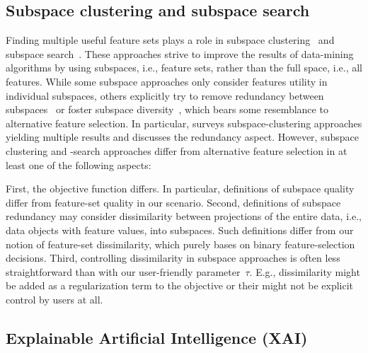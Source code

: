 \documentclass{article}
\theoremstyle{definition}
\begin{document}
\subsection{Subspace clustering and subspace search}
\label{sec:afs:related-work:subspace}

Finding multiple useful feature sets plays a role in subspace clustering~\cite{hu2018subspace, mueller2009relevant} and subspace search~\cite{fouche2021efficient, nguyen20134s, trittenbach2019dimension}.
These approaches strive to improve the results of data-mining algorithms by using subspaces, i.e., feature sets, rather than the full space, i.e., all features.
While some subspace approaches only consider features utility in individual subspaces, others explicitly try to remove redundancy between subspaces~\cite{mueller2009relevant, nguyen20134s} or foster subspace diversity~\cite{fouche2021efficient, trittenbach2019dimension}, which bears some resemblance to alternative feature selection.
In particular, \cite{hu2018subspace} surveys subspace-clustering approaches yielding multiple results and discusses the redundancy aspect.
However, subspace clustering and -search approaches differ from alternative feature selection in at least one of the following aspects:

First, the objective function differs.
In particular, definitions of subspace quality differ from feature-set quality in our scenario.
Second, definitions of subspace redundancy may consider dissimilarity between projections of the entire data, i.e., data objects with feature values, into subspaces.
Such definitions differ from our notion of feature-set dissimilarity, which purely bases on binary feature-selection decisions.
Third, controlling dissimilarity in subspace approaches is often less straightforward than with our user-friendly parameter~$\tau$.
E.g., dissimilarity might be added as a regularization term to the objective or their might not be explicit control by users at all.

\subsection{Explainable Artificial Intelligence (XAI)}
\label{sec:afs:related-work:xai}
\end{document}
